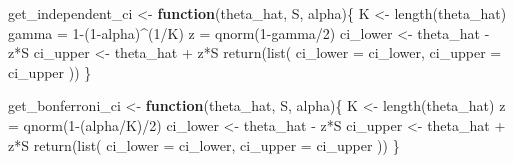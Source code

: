 \documentclass[
  12pt,
  a4paper,
]{article}
\newenvironment{Shaded}{\begin{snugshade}}{\end{snugshade}}
\newcommand{\AttributeTok}[1]{\textcolor[rgb]{0.00,0.34,0.68}{#1}}
\newcommand{\ControlFlowTok}[1]{\textcolor[rgb]{0.12,0.11,0.11}{\textbf{#1}}}
\newcommand{\DecValTok}[1]{\textcolor[rgb]{0.69,0.50,0.00}{#1}}
\newcommand{\FunctionTok}[1]{\textcolor[rgb]{0.39,0.29,0.61}{#1}}
\newcommand{\NormalTok}[1]{\textcolor[rgb]{0.12,0.11,0.11}{#1}}
\newcommand{\OtherTok}[1]{\textcolor[rgb]{0.00,0.43,0.16}{#1}}
\newcommand{\SpecialCharTok}[1]{\textcolor[rgb]{0.24,0.68,0.91}{#1}}
\numberwithin{equation}{section}
\begin{document}
\begin{Shaded}
\begin{Highlighting}[]
\NormalTok{ get\_independent\_ci }\OtherTok{\textless{}{-}} \ControlFlowTok{function}\NormalTok{(theta\_hat,}
\NormalTok{                               S,}
\NormalTok{                               alpha)\{}
\NormalTok{  K }\OtherTok{\textless{}{-}} \FunctionTok{length}\NormalTok{(theta\_hat)}
\NormalTok{  gamma }\OtherTok{=} \DecValTok{1}\SpecialCharTok{{-}}\NormalTok{(}\DecValTok{1}\SpecialCharTok{{-}}\NormalTok{alpha)}\SpecialCharTok{\^{}}\NormalTok{(}\DecValTok{1}\SpecialCharTok{/}\NormalTok{K)}
\NormalTok{  z }\OtherTok{=} \FunctionTok{qnorm}\NormalTok{(}\DecValTok{1}\SpecialCharTok{{-}}\NormalTok{gamma}\SpecialCharTok{/}\DecValTok{2}\NormalTok{)}
\NormalTok{  ci\_lower }\OtherTok{\textless{}{-}}\NormalTok{ theta\_hat }\SpecialCharTok{{-}}\NormalTok{ z}\SpecialCharTok{*}\NormalTok{S}
\NormalTok{  ci\_upper }\OtherTok{\textless{}{-}}\NormalTok{ theta\_hat }\SpecialCharTok{+}\NormalTok{ z}\SpecialCharTok{*}\NormalTok{S}
  \FunctionTok{return}\NormalTok{(}\FunctionTok{list}\NormalTok{(}
    \AttributeTok{ci\_lower =}\NormalTok{ ci\_lower,}
    \AttributeTok{ci\_upper =}\NormalTok{ ci\_upper}
\NormalTok{  ))}
\NormalTok{\}}

\NormalTok{get\_bonferroni\_ci }\OtherTok{\textless{}{-}} \ControlFlowTok{function}\NormalTok{(theta\_hat,}
\NormalTok{                              S,}
\NormalTok{                              alpha)\{}
\NormalTok{  K }\OtherTok{\textless{}{-}} \FunctionTok{length}\NormalTok{(theta\_hat)}
\NormalTok{  z }\OtherTok{=} \FunctionTok{qnorm}\NormalTok{(}\DecValTok{1}\SpecialCharTok{{-}}\NormalTok{(alpha}\SpecialCharTok{/}\NormalTok{K)}\SpecialCharTok{/}\DecValTok{2}\NormalTok{)}
\NormalTok{  ci\_lower }\OtherTok{\textless{}{-}}\NormalTok{ theta\_hat }\SpecialCharTok{{-}}\NormalTok{ z}\SpecialCharTok{*}\NormalTok{S}
\NormalTok{  ci\_upper }\OtherTok{\textless{}{-}}\NormalTok{ theta\_hat }\SpecialCharTok{+}\NormalTok{ z}\SpecialCharTok{*}\NormalTok{S}
  \FunctionTok{return}\NormalTok{(}\FunctionTok{list}\NormalTok{(}
    \AttributeTok{ci\_lower =}\NormalTok{ ci\_lower,}
    \AttributeTok{ci\_upper =}\NormalTok{ ci\_upper}
\NormalTok{  ))}
\NormalTok{\}}


\end{Highlighting}
\end{Shaded}
\end{document}
